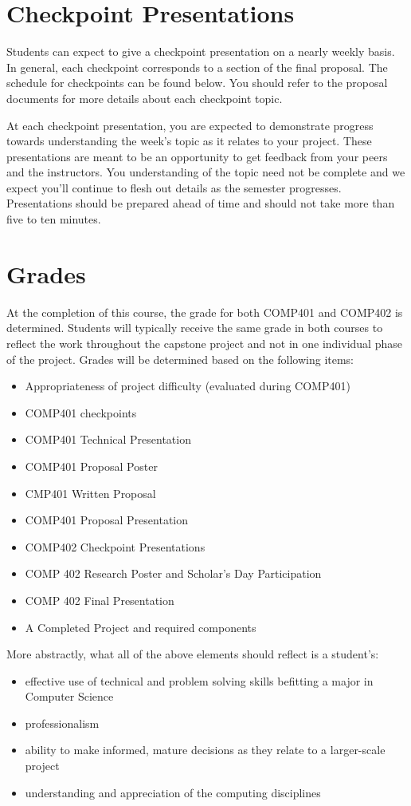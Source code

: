 \documentclass[10pt]{article}
\begin{document}
\section{Checkpoint Presentations}

Students can expect to give a checkpoint presentation on a nearly weekly basis. In general, each checkpoint corresponds to a section of the final proposal. The schedule for checkpoints can be found below. You should refer to the proposal documents for more details about each checkpoint topic. 

At each checkpoint presentation, you are expected to demonstrate progress towards understanding the week's topic as it relates to your project.  These presentations are meant to be an opportunity to get feedback from your peers and the instructors.  You understanding of the topic need not be complete and we expect you'll continue to flesh out details as the semester progresses.  Presentations should be prepared ahead of time and should not take more than five to ten minutes. 

\section{Grades}

At the completion of this course, the grade for both COMP401 and COMP402 is determined. Students will typically receive the same grade in both courses to reflect the work throughout the capstone project and not in one individual phase of the project. Grades will be determined based on the following items:
\begin{itemize}
\item Appropriateness of project difficulty (evaluated during COMP401) 
\item COMP401 checkpoints
\item COMP401 Technical Presentation
\item COMP401 Proposal Poster
\item CMP401 Written Proposal
\item COMP401 Proposal Presentation
\item COMP402 Checkpoint Presentations 
\item COMP 402 Research Poster and Scholar's Day Participation 
\item COMP 402 Final Presentation 
\item A Completed Project and required components
\end{itemize}

More abstractly, what all of the above elements should reflect is a student's: 
\begin{itemize}
\item effective use of technical and problem solving skills befitting a major in Computer Science
\item professionalism
\item ability to make informed, mature decisions as they relate to a larger-scale project
\item understanding and appreciation of the computing disciplines
\end{itemize}
\end{document}
